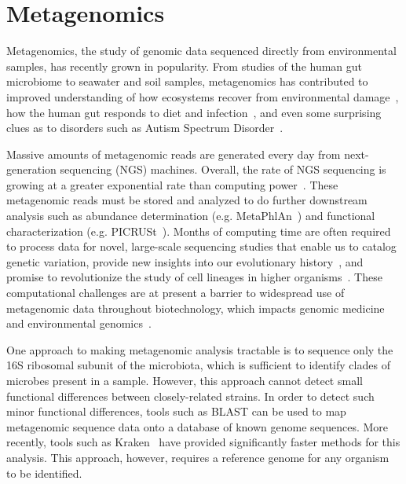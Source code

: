\documentclass{amsbook}
\theoremstyle{definition}
\theoremstyle{remark}
\numberwithin{equation}{section}
\begin{document}
\section*{Metagenomics}

Metagenomics, the study of genomic data sequenced directly from environmental
samples, has recently grown in popularity.
From studies of the human gut microbiome to seawater and soil samples,
metagenomics has contributed to improved understanding of how ecosystems recover
from environmental damage~\cite{Tyson:2004}, how the human gut responds to 
diet
and infection~\cite{David:2014}, and even some surprising clues as to disorders 
such as Autism Spectrum Disorder~\cite{MacFabe:2012}.

Massive amounts of metagenomic reads are generated every day from 
next-generation sequencing (NGS) machines.
Overall, the rate of NGS sequencing is growing at a greater exponential rate
than computing power~\cite{Loh}.
These metagenomic reads must be stored and analyzed to do further downstream
analysis such as abundance determination (e.g. MetaPhlAn~\cite{Huttenhower}) 
and functional characterization (e.g. PICRUSt~\cite{Huttenhower}).
 Months of computing time are often required to process data for novel, 
large-scale sequencing studies that enable us to catalog genetic variation, 
provide new insights into our evolutionary history~\cite{8}, and promise to 
revolutionize the study of cell lineages in higher organisms~\cite{9}. 
These computational challenges are at present a barrier to widespread use of 
metagenomic data throughout biotechnology, which impacts genomic medicine and 
environmental genomics~\cite{blah}.

One approach to making metagenomic analysis tractable is to
sequence only the 16S ribosomal subunit of the microbiota, which is sufficient
to identify clades of microbes present in a sample. 
However, this approach cannot detect small functional differences between 
closely-related strains. 
In order to detect such minor functional differences, tools such as BLAST can 
be used to map metagenomic sequence data onto a database of known genome
sequences.
More recently, tools such as Kraken~\cite{kraken} have provided significantly 
faster methods for this analysis.
This approach, however, requires a reference genome for any organism to be
identified.
\end{document}
